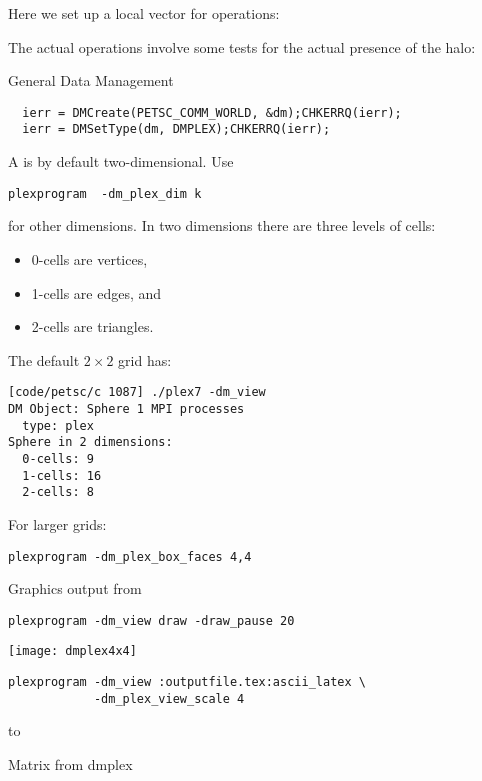 Here we set up a local vector for operations:
%

The actual operations involve some tests for the actual presence of the halo:
%

 {General Data Management}

\begin{lstlisting}
  ierr = DMCreate(PETSC_COMM_WORLD, &dm);CHKERRQ(ierr);
  ierr = DMSetType(dm, DMPLEX);CHKERRQ(ierr);
\end{lstlisting}

A  is by default two-dimensional.
Use
\begin{verbatim}
plexprogram  -dm_plex_dim k
\end{verbatim}
for other dimensions.
In two dimensions there are three levels of cells:
\begin{itemize}
\item
  0-cells are vertices,
\item 1-cells are edges, and
\item 2-cells are triangles.
\end{itemize}

The default $2\times 2$ grid has:
\begin{verbatim}
[code/petsc/c 1087] ./plex7 -dm_view
DM Object: Sphere 1 MPI processes
  type: plex
Sphere in 2 dimensions:
  0-cells: 9
  1-cells: 16
  2-cells: 8
\end{verbatim}

For larger grids:
\begin{verbatim}
plexprogram -dm_plex_box_faces 4,4
\end{verbatim}

\begin{multicols}{2}
  Graphics output from
\begin{verbatim}
plexprogram -dm_view draw -draw_pause 20
\end{verbatim}
\vfill
\columnbreak
\texttt{[image: dmplex4x4]}
\end{multicols}

\begin{verbatim}
plexprogram -dm_view :outputfile.tex:ascii_latex \
            -dm_plex_view_scale 4
\end{verbatim}

\hbox to \textwidth {

\hfil

}

 {Matrix from dmplex}

